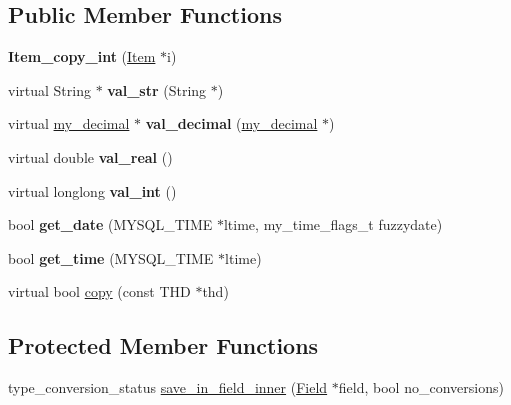 \subsection*{Public Member Functions}
\begin{DoxyCompactItemize}
\item 
\mbox{\label{classItem__copy__int_a7783577d999c07443dc6c0e06bd0deb0}} 
{\bfseries Item\+\_\+copy\+\_\+int} (\mbox{\hyperlink{classItem}{Item}} $\ast$i)
\item 
\mbox{\label{classItem__copy__int_a2ac52d4b520b3dbe251c62745e1e610a}} 
virtual String $\ast$ {\bfseries val\+\_\+str} (String $\ast$)
\item 
\mbox{\label{classItem__copy__int_a5f5dc0d70721a8a9af77727dd17fe4b8}} 
virtual \mbox{\hyperlink{classmy__decimal}{my\+\_\+decimal}} $\ast$ {\bfseries val\+\_\+decimal} (\mbox{\hyperlink{classmy__decimal}{my\+\_\+decimal}} $\ast$)
\item 
\mbox{\label{classItem__copy__int_abd44d4bb60c196fe62dcabcafe0cec8f}} 
virtual double {\bfseries val\+\_\+real} ()
\item 
\mbox{\label{classItem__copy__int_a8c8586d32c4ed45d2f2b80fe6eee6920}} 
virtual longlong {\bfseries val\+\_\+int} ()
\item 
\mbox{\label{classItem__copy__int_a1d18457c7ec1b8a1e8bfce1dd3c1ffe1}} 
bool {\bfseries get\+\_\+date} (M\+Y\+S\+Q\+L\+\_\+\+T\+I\+ME $\ast$ltime, my\+\_\+time\+\_\+flags\+\_\+t fuzzydate)
\item 
\mbox{\label{classItem__copy__int_a5bfb3c97111b999bd102e78cb4836f28}} 
bool {\bfseries get\+\_\+time} (M\+Y\+S\+Q\+L\+\_\+\+T\+I\+ME $\ast$ltime)
\item 
virtual bool \mbox{\hyperlink{classItem__copy__int_adb454f84e2c727dfc8891347f51c4fae}{copy}} (const T\+HD $\ast$thd)
\end{DoxyCompactItemize}
\subsection*{Protected Member Functions}
\begin{DoxyCompactItemize}
\item 
type\+\_\+conversion\+\_\+status \mbox{\hyperlink{classItem__copy__int_add731c9db4197e971b70f6f4b1b988cc}{save\+\_\+in\+\_\+field\+\_\+inner}} (\mbox{\hyperlink{classField}{Field}} $\ast$field, bool no\+\_\+conversions)
\end{DoxyCompactItemize}

